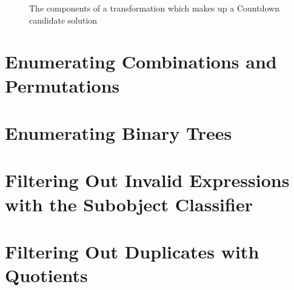 \begin{figure}
  \caption{The components of a transformation which makes up a Countdown
    candidate solution}
\end{figure}

\section{Enumerating Combinations and Permutations}
\section{Enumerating Binary Trees}
\section{Filtering Out Invalid Expressions with the Subobject Classifier}
\section{Filtering Out Duplicates with Quotients}


